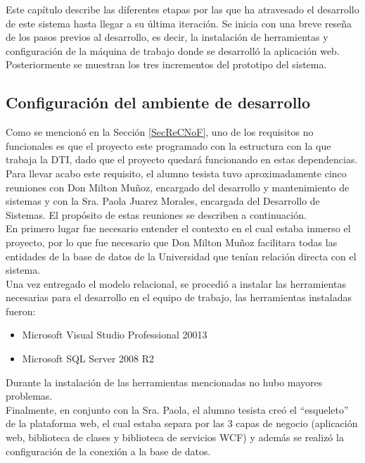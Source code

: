 Este capítulo describe las diferentes etapas por las que ha atravesado el desarrollo de
este sistema hasta llegar a su última iteración. Se inicia con una breve reseña de los pasos
previos al desarrollo, es decir, la instalación de herramientas y configuración de la máquina
de trabajo donde se desarrolló la aplicación web. Posteriormente se muestran los tres incrementos del prototipo del sistema.

\subsection{Configuración del ambiente de desarrollo}

Como se mencionó en la Sección \ref{SecReCNoF}, uno de los requisitos no funcionales es que el proyecto este programado con la estructura con la que trabaja la DTI, dado que el proyecto quedará funcionando en estas dependencias. Para llevar acabo este requisito, el alumno tesista tuvo aproximadamente cinco reuniones con Don Milton Muñoz, encargado del desarrollo y mantenimiento de sistemas y con la Sra. Paola Juarez Morales, encargada del Desarrollo de Sistemas. El propósito de estas reuniones se describen a continuación.
\\

En primero lugar fue necesario entender el contexto en el cual estaba inmerso el proyecto, por lo que fue necesario que Don Milton Muñoz facilitara todas las entidades de la base de datos de la Universidad que tenían relación directa con el sistema.
\\

Una vez entregado el modelo relacional, se procedió a instalar las herramientas necesarias para el desarrollo en el equipo de trabajo, las herramientas instaladas fueron:
\begin{itemize}
	\item Microsoft Visual Studio Professional 20013
	\item Microsoft SQL Server 2008 R2
\end{itemize}

Durante la instalación de las herramientas mencionadas no hubo mayores problemas.
\\

Finalmente, en conjunto con la Sra. Paola, el alumno tesista creó el ``esqueleto'' de la plataforma web, el cual estaba separa por las 3 capas de negocio (aplicación web, biblioteca de clases y biblioteca de servicios WCF) y además se realizó la configuración de la conexión a la base de datos.



